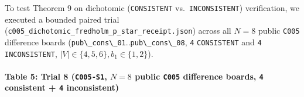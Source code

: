\documentclass[
  11pt,
]{article}
\newcommand{\passthrough}[1]{#1}
\begin{document}
To test Theorem 9 on dichotomic (\passthrough{\lstinline!CONSISTENT!}
vs.~\passthrough{\lstinline!INCONSISTENT!}) verification, we executed a
bounded paired trial
(\nolinkurl{c005_dichotomic_fredholm_p_star_receipt.json}) across all
\(N = 8\) public \passthrough{\lstinline!C005!} difference boards
(\passthrough{\lstinline!pub\_cons\_01!}..\passthrough{\lstinline!pub\_cons\_08!},
\passthrough{\lstinline!4!} \passthrough{\lstinline!CONSISTENT!} and
\passthrough{\lstinline!4!} \passthrough{\lstinline!INCONSISTENT!},
\(|V| \in \{4,\allowbreak  5,\allowbreak  6\},\allowbreak  b_1 \in \{1,\allowbreak  2\}\)).

\paragraph{\texorpdfstring{Table 5: Trial 8 (\texttt{C005-S1}, \(N = 8\)
public \texttt{C005} difference boards, \texttt{4} consistent +
\texttt{4}
inconsistent)}{Table 5: Trial 8 (C005-S1, N = 8 public C005 difference boards, 4 consistent + 4 inconsistent)}}\label{table-5-trial-8-c005-s1-n-8-public-c005-difference-boards-4-consistent-4-inconsistent}
\end{document}
